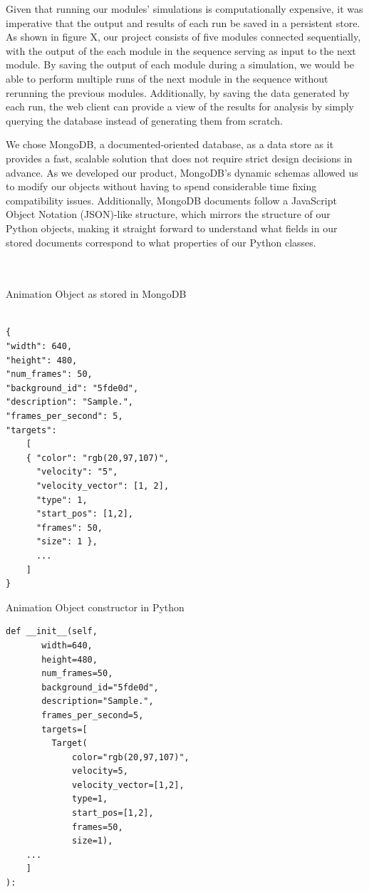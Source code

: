 \documentclass[a4paper,11pt]{article}
\begin{document}
Given that running our modules' simulations is computationally expensive, it was imperative that the output and results of each run be saved in a persistent store. As shown in figure X, our project consists of five modules connected sequentially, with the output of the each module in the sequence serving as input to the next module. By saving the output of each module during a simulation, we would be able to perform multiple runs of the next module in the sequence without rerunning the previous modules. Additionally, by saving the data generated by each run, the web client can provide a view of the results for analysis by simply querying the database instead of generating them from scratch.

We chose MongoDB, a documented-oriented database, as a data store as it provides a fast, scalable solution that does not require strict design decisions in advance. As we developed our product, MongoDB's dynamic schemas allowed us to modify our objects without having to spend considerable time fixing compatibility issues. Additionally, MongoDB documents follow a JavaScript Object Notation (JSON)-like structure, which mirrors the structure of our Python objects, making it straight forward to understand what fields in our stored documents correspond to what properties of our Python classes.\\
\\
\\
\begin{minipage}[t]{0.5\textwidth}
\centering  
Animation Object as stored in MongoDB
\begin{verbatim}
  
{
"width": 640,
"height": 480,
"num_frames": 50,
"background_id": "5fde0d",
"description": "Sample.",
"frames_per_second": 5,
"targets":
	[
	{ "color": "rgb(20,97,107)",
	  "velocity": "5",
	  "velocity_vector": [1, 2],
	  "type": 1,
	  "start_pos": [1,2],
	  "frames": 50,
	  "size": 1 },
	  ...
	]
}
\end{verbatim}
\end{minipage} 
\begin{minipage}[t]{0.5\textwidth}
\centering  
Animation Object constructor in Python
\begin{verbatim}	
def __init__(self,
  	   width=640,
  	   height=480,    
  	   num_frames=50,
  	   background_id="5fde0d",
  	   description="Sample.",
  	   frames_per_second=5,
  	   targets=[
  	     Target(
	         color="rgb(20,97,107)",
	         velocity=5,
	         velocity_vector=[1,2],
	         type=1,
	         start_pos=[1,2],
	         frames=50,
	         size=1),
	...
	]
):
\end{verbatim}
\end{minipage}
\end{document}
